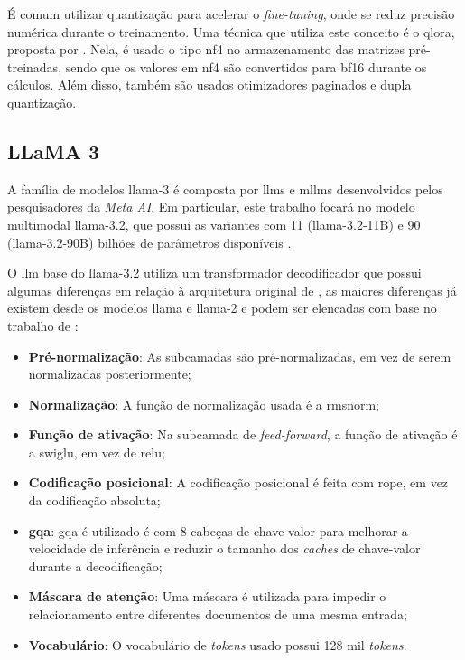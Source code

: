 É comum utilizar quantização para acelerar o \textit{fine-tuning}, onde se reduz precisão numérica durante o
treinamento. Uma técnica que utiliza este conceito é o \ac{qlora}, proposta por \textcite{qlora}. Nela, é usado o tipo
\ac{nf4} no armazenamento das matrizes pré-treinadas, sendo que os valores em \ac{nf4} são convertidos para \ac{bf16}
durante os cálculos. Além disso, também são usados otimizadores paginados e dupla quantização.

\subsection{LLaMA 3}

A família de modelos \ac{llama}-3 é composta por \acp{llm} e \acp{mllm} desenvolvidos pelos pesquisadores da
\textit{Meta AI}. Em particular, este trabalho focará no modelo multimodal \ac{llama}-3.2, que possui as variantes com
11 (\ac{llama}-3.2-11B) e 90 (\ac{llama}-3.2-90B) bilhões de parâmetros disponíveis \cite{dubey2024llama}.

O \ac{llm} base do \ac{llama}-3.2 utiliza um transformador decodificador que possui algumas diferenças em relação à
arquitetura original de \textcite{transformer}, as maiores diferenças já existem desde os modelos \ac{llama} e
\ac{llama}-2 e podem ser elencadas com base no trabalho de \textcite{touvron2023llama}:

\begin{itemize}
    \item \textbf{Pré-normalização}: As subcamadas são pré-normalizadas, em vez de serem normalizadas
          posteriormente;
    \item \textbf{Normalização}: A função de normalização usada é a \ac{rmsnorm};
    \item \textbf{Função de ativação}: Na subcamada de \textit{feed-forward}, a função de ativação é a \ac{swiglu},
          em vez de
          \ac{relu};
    \item \textbf{Codificação posicional}: A codificação posicional é feita com \ac{rope}, em vez da codificação
          absoluta;
    \item \textbf{\acs{gqa}}: \ac{gqa} é utilizado é com 8 cabeças de chave-valor para melhorar a velocidade de
          inferência e
          reduzir o tamanho dos \textit{caches} de chave-valor durante a decodificação;
    \item \textbf{Máscara de atenção}: Uma máscara é utilizada para impedir o relacionamento entre diferentes
          documentos de uma
          mesma entrada;
    \item \textbf{Vocabulário}: O vocabulário de \textit{tokens} usado possui 128 mil \textit{tokens}.
\end{itemize}

